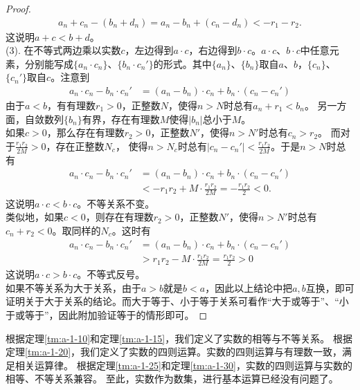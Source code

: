 \documentclass[12pt,UTF8,fontset=none]{ctexbook}
\begin{document}
\begin{appendix}
\begin{proof}
    \begin{align*}
        a_n + c_n-(b_n + d_n) = a_n - b_n +  (c_n - d_n) < -r_1 - r_2 .
    \end{align*}
    这说明$a + c < b + d$。\\
    (3). 在不等式两边乘以实数$c$，左边得到$a\cdot c$，右边得到$b\cdot c$。$a\cdot c$、$b\cdot c$中任意元素，分别能写成$\{a_n\cdot c_n\}$、$\{b_n\cdot c_n'\}$的形式。其中$\{a_n\}$、$\{b_n\}$取自$a$、$b$，$\{c_n\}$、$\{c_n'\}$取自$c$。注意到
    \begin{align*}
        a_n\cdot c_n - b_n\cdot c_n' &= (a_n - b_n)\cdot c_n + b_n\cdot(c_n - c_n')  
    \end{align*}
    由于$a< b$，有有理数$r_1>0$，正整数$N$，使得$n>N$时总有$a_n + r_1 < b_n$。
    另一方面，自敛数列$\{b_n\}$有界，存在有理数$M$使得$|b_n|$总小于$M$。\\
    如果$c > 0$，那么存在有理数$r_2>0$，正整数$N'$，使得$n>N'$时总有$c_n > r_2$。
    而对于$\frac{r_1r_2}{2M}>0$，存在正整数$N_c$，
    使得$n>N_c$时总有$|c_n - c_n'| < \frac{r_1r_2}{2M}$。于是$n>N$时总有
    \begin{align*}
        a_n\cdot c_n - b_n\cdot c_n' &= (a_n - b_n)\cdot c_n + b_n\cdot(c_n - c_n')  \\
        &< -r_1r_2 + M\cdot\frac{r_1r_2}{2M} = -\frac{r_1r_2}{2} < 0 .
    \end{align*}
    这说明$a\cdot c < b\cdot c$。不等关系不变。\\
    类似地，如果$c < 0$，则存在有理数$r_2>0$，正整数$N'$，使得$n>N'$时总有$c_n + r_2 < 0$。取同样的$N_c$。这时有
    \begin{align*}
        a_n\cdot c_n - b_n\cdot c_n' &= (a_n - b_n)\cdot c_n + b_n\cdot(c_n - c_n')  \\
        &> r_1r_2 - M\cdot\frac{r_1r_2}{2M} = \frac{r_1r_2}{2} > 0 
    \end{align*}
    这说明$a\cdot c > b\cdot c$。不等式反号。\\
    如果不等关系为大于关系，由于$a>b$就是$b<a$，因此以上结论中把$a,b$互换，即可证明关于大于关系的结论。而大于等于、小于等于关系可看作“大于或等于”、“小于或等于”，因此附加验证等于的情形即可。  
\end{proof}

根据定理\ref{tm:a-1-10}和定理\ref{tm:a-1-15}，我们定义了实数的相等与不等关系。
根据定理\ref{tm:a-1-20}，我们定义了实数的四则运算。实数的四则运算与有理数一致，满足相关运算律。
根据定理\ref{tm:a-1-25}和定理\ref{tm:a-1-30}，实数的四则运算与实数的相等、不等关系兼容。
至此，实数作为数集，进行基本运算已经没有问题了。


\end{appendix}
\end{document}
